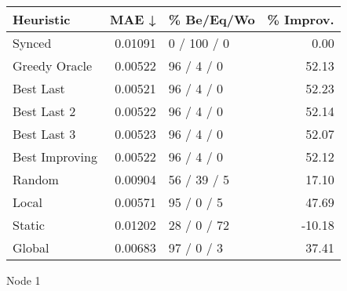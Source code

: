 \begin{tabular}{lrlr}
\toprule
\textbf{Heuristic} & \textbf{MAE ↓} & \textbf{\% Be/Eq/Wo} & \textbf{\% Improv.} \\
\midrule
            Synced &        0.01091 &          0 / 100 / 0 &                0.00 \\
     Greedy Oracle &        0.00522 &           96 / 4 / 0 &               52.13 \\
         Best Last &        0.00521 &           96 / 4 / 0 &               52.23 \\
       Best Last 2 &        0.00522 &           96 / 4 / 0 &               52.14 \\
       Best Last 3 &        0.00523 &           96 / 4 / 0 &               52.07 \\
    Best Improving &        0.00522 &           96 / 4 / 0 &               52.12 \\
            Random &        0.00904 &          56 / 39 / 5 &               17.10 \\
             Local &        0.00571 &           95 / 0 / 5 &               47.69 \\
            Static &        0.01202 &          28 / 0 / 72 &              -10.18 \\
            Global &        0.00683 &           97 / 0 / 3 &               37.41 \\
\bottomrule
\end{tabular}
\caption{Node 1}
\label{tab:non_lr01_le1_bs2_1}
